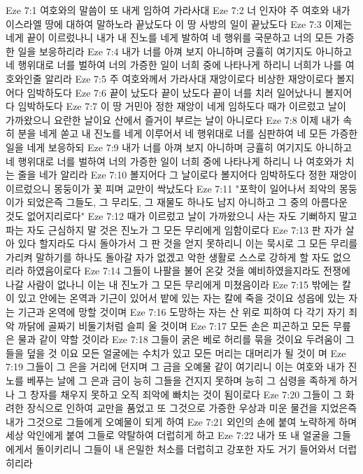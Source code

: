 Eze 7:1  여호와의 말씀이 또 내게 임하여 가라사대
Eze 7:2  너 인자야 주 여호와 내가 이스라엘 땅에 대하여 말하노라 끝났도다 이 땅 사방의 일이 끝났도다
Eze 7:3  이제는 네게 끝이 이르렀나니 내가 내 진노를 네게 발하여 네 행위를 국문하고 너의 모든 가증한 일을 보응하리라
Eze 7:4  내가 너를 아껴 보지 아니하며 긍휼히 여기지도 아니하고 네 행위대로 너를 벌하여 너의 가증한 일이 너희 중에 나타나게 하리니 너희가 나를 여호와인줄 알리라
Eze 7:5  주 여호와께서 가라사대 재앙이로다 비상한 재앙이로다 볼지어다 임박하도다
Eze 7:6  끝이 났도다 끝이 났도다 끝이 너를 치러 일어났나니 볼지어다 임박하도다
Eze 7:7  이 땅 거민아 정한 재앙이 네게 임하도다 때가 이르렀고 날이 가까왔으니 요란한 날이요 산에서 즐거이 부르는 날이 아니로다
Eze 7:8  이제 내가 속히 분을 네게 쏟고 내 진노를 네게 이루어서 네 행위대로 너를 심판하여 네 모든 가증한 일을 네게 보응하되
Eze 7:9  내가 너를 아껴 보지 아니하며 긍휼히 여기지도 아니하고 네 행위대로 너를 벌하여 너의 가증한 일이 너희 중에 나타나게 하리니 나 여호와가 치는 줄을 네가 알리라
Eze 7:10  볼지어다 그 날이로다 볼지어다 임박하도다 정한 재앙이 이르렀으니 몽둥이가 꽃 피며 교만이 싹났도다
Eze 7:11  "포학이 일어나서 죄악의 몽둥이가 되었은즉 그들도, 그 무리도, 그 재물도 하나도 남지 아니하고 그 중의 아름다운 것도 없어지리로다"
Eze 7:12  때가 이르렀고 날이 가까왔으니 사는 자도 기뻐하지 말고 파는 자도 근심하지 말 것은 진노가 그 모든 무리에게 임함이로다
Eze 7:13  판 자가 살아 있다 할지라도 다시 돌아가서 그 판 것을 얻지 못하리니 이는 묵시로 그 모든 무리를 가리켜 말하기를 하나도 돌아갈 자가 없겠고 악한 생활로 스스로 강하게 할 자도 없으리라 하였음이로다
Eze 7:14  그들이 나팔을 불어 온갖 것을 예비하였을지라도 전쟁에 나갈 사람이 없나니 이는 내 진노가 그 모든 무리에게 미쳤음이라
Eze 7:15  밖에는 칼이 있고 안에는 온역과 기근이 있어서 밭에 있는 자는 칼에 죽을 것이요 성읍에 있는 자는 기근과 온역에 망할 것이며
Eze 7:16  도망하는 자는 산 위로 피하여 다 각기 자기 죄악 까닭에 골짜기 비둘기처럼 슬피 울 것이며
Eze 7:17  모든 손은 피곤하고 모든 무릎은 물과 같이 약할 것이라
Eze 7:18  그들이 굵은 베로 허리를 묶을 것이요 두려움이 그들을 덮을 것 이요 모든 얼굴에는 수치가 있고 모든 머리는 대머리가 될 것이 며
Eze 7:19  그들이 그 은을 거리에 던지며 그 금을 오예물 같이 여기리니 이는 여호와 내가 진노를 베푸는 날에 그 은과 금이 능히 그들을 건지지 못하며 능히 그 심령을 족하게 하거나 그 창자를 채우지 못하고 오직 죄악에 빠치는 것이 됨이로다
Eze 7:20  그들이 그 화려한 장식으로 인하여 교만을 품었고 또 그것으로 가증한 우상과 미운 물건을 지었은즉 내가 그것으로 그들에게 오예물이 되게 하여
Eze 7:21  외인의 손에 붙여 노략하게 하며 세상 악인에게 붙여 그들로 약탈하여 더럽히게 하고
Eze 7:22  내가 또 내 얼굴을 그들에게서 돌이키리니 그들이 내 은밀한 처소를 더럽히고 강포한 자도 거기 들어와서 더럽히리라
